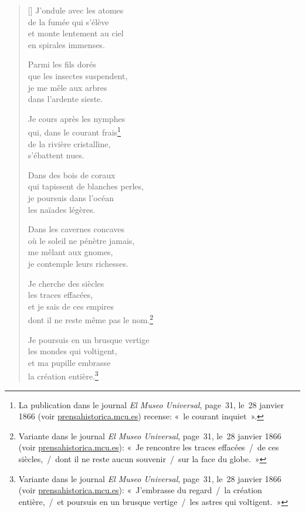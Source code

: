 \documentclass[a4paper,12pt]{book}
\begin{document}
\begin{verse}[\versewidth]
  J'ondule avec les atomes \\
  de la fumée qui s'élève \\
  et monte lentement au ciel \\
  en spirales immenses.

  Parmi les fils dorés \\
  que les insectes suspendent, \\
  je me mêle aux arbres \\
  dans l'ardente sieste.

  Je cours après les nymphes \\
  qui, dans le courant frais\footnote{La publication dans
le journal \emph{El Museo Universal}, page~31, le~28 janvier 1866
(voir \url{prensahistorica.mcu.es}) recense: «~le courant inquiet~».} \\
  de la rivière cristalline, \\
  s'ébattent nues.

  Dans des bois de coraux \\
  qui tapissent de blanches perles, \\
  je poursuis dans l'océan \\
  les naïades légères.

  Dans les cavernes concaves \\
  où le soleil ne pénètre jamais, \\
  me mêlant aux gnomes, \\
  je contemple leurs richesses.

  Je cherche des siècles \\
  les traces effacées, \\
  et je sais de ces empires \\
  dont il ne reste même pas le nom.\footnote{Variante dans le journal
  \emph{El Museo Universal}, page~31, le~28 janvier 1866 (voir
  \url{prensahistorica.mcu.es}): «~Je rencontre les traces effacées~/~de ces siècles,~/~dont il ne reste aucun souvenir~/~sur la face du globe.~»}

  Je poursuis en un brusque vertige \\
  les mondes qui voltigent, \\
  et ma pupille embrasse \\
  la création entière.\footnote{Variante dans le journal
  \emph{El Museo Universal}, page~31, le~28 janvier 1866 (voir
  \url{prensahistorica.mcu.es}): «~J'embrasse du regard~/~la création
  entière,~/~et poursuis en un brusque vertige~/~les astres qui voltigent.~»}


\end{verse}
\end{document}
